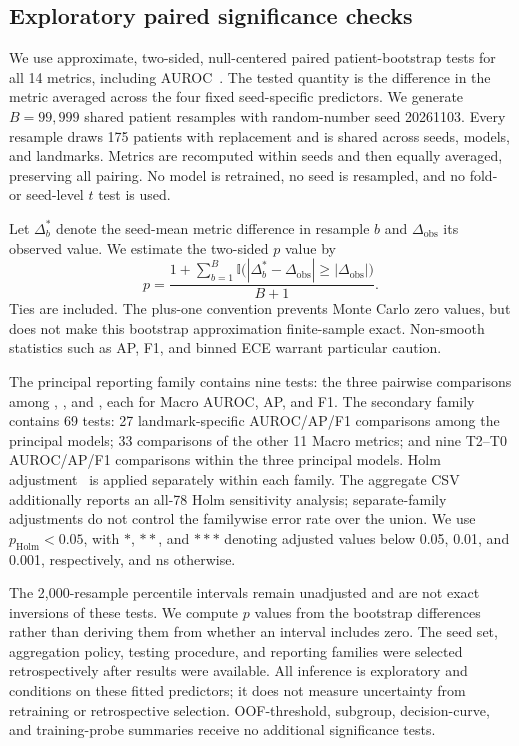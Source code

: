 \subsection{Exploratory paired significance checks}
We use approximate, two-sided, null-centered paired patient-bootstrap tests for all 14 metrics, including AUROC~\citep{davison1997}. The tested quantity is the difference in the metric averaged across the four fixed seed-specific predictors. We generate $B=99{,}999$ shared patient resamples with random-number seed 20261103. Every resample draws 175 patients with replacement and is shared across seeds, models, and landmarks. Metrics are recomputed within seeds and then equally averaged, preserving all pairing. No model is retrained, no seed is resampled, and no fold- or seed-level $t$ test is used.

Let $\Delta_b^*$ denote the seed-mean metric difference in resample $b$ and $\Delta_{\mathrm{obs}}$ its observed value. We estimate the two-sided $p$ value by
\begin{equation}
 p=\frac{1+\sum_{b=1}^{B}\mathbb{I}\bigl(|\Delta_b^*-\Delta_{\mathrm{obs}}|\geq|\Delta_{\mathrm{obs}}|\bigr)}{B+1}.
\end{equation}
Ties are included. The plus-one convention prevents Monte Carlo zero values, but does not make this bootstrap approximation finite-sample exact. Non-smooth statistics such as AP, F1, and binned ECE warrant particular caution.

The principal reporting family contains nine tests: the three pairwise comparisons among \nojepa{}, \direct{}, and \fullmodel{}, each for Macro AUROC, AP, and F1. The secondary family contains 69 tests: 27 landmark-specific AUROC/AP/F1 comparisons among the principal models; 33 comparisons of the other 11 Macro metrics; and nine T2--T0 AUROC/AP/F1 comparisons within the three principal models. Holm adjustment~\citep{holm1979} is applied separately within each family. The aggregate CSV additionally reports an all-78 Holm sensitivity analysis; separate-family adjustments do not control the familywise error rate over the union. We use $p_{\mathrm{Holm}}<0.05$, with $*$, $**$, and $***$ denoting adjusted values below 0.05, 0.01, and 0.001, respectively, and ns otherwise.

The 2,000-resample percentile intervals remain unadjusted and are not exact inversions of these tests. We compute $p$ values from the bootstrap differences rather than deriving them from whether an interval includes zero. The seed set, aggregation policy, testing procedure, and reporting families were selected retrospectively after results were available. All inference is exploratory and conditions on these fitted predictors; it does not measure uncertainty from retraining or retrospective selection. OOF-threshold, subgroup, decision-curve, and training-probe summaries receive no additional significance tests.



